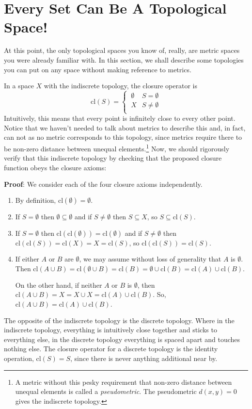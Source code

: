 \documentclass{report}
\newcommand{\cl}{\mathrm{cl}}
\begin{document}
\section{Every Set Can Be A Topological Space!}

At this point, the only topological spaces you know of, really, are metric spaces you were already familiar with. In this section, we shall describe some topologies you can put on any space without making reference to metrics.

In a space $X$ with the indiscrete topology, the closure operator is $$\cl(S) = \begin{cases} ~∅ & S = ∅\\ ~X & S \neq ∅\\ \end{cases} $$ Intuitively, this means that every point is infinitely close to every other point. Notice that we haven't needed to talk about metrics to describe this and, in fact, can not as no metric corresponds to this topology, since metrics require there to be non-zero distance between unequal elements.\footnote{A metric without this pesky requirement that non-zero distance between unequal elements is called a \emph{pseudometric}. The pseudometric $d(x,y) = 0$ gives the indiscrete topology.} Now, we should rigorously verify that this indiscrete topology by checking that the proposed closure function obeys the closure axioms:

{\bf Proof}: We consider each of the four closure axioms independently.
\begin{enumerate}
\item By definition, $\cl(∅) = ∅$.
\item If $S=∅$ then $∅ ⊆ ∅$ and if $S \neq ∅$ then $S ⊆ X$, so $S ⊆ \cl(S)$.
\item If $S=∅$ then $\cl(\cl(∅)) =  \cl(∅)$ and if $S \neq ∅$ then $\cl(\cl(S)) =  \cl(X) = X = \cl(S)$, so $\cl(\cl(S)) = \cl(S)$.
\item If either $A$ or $B$ are $∅$, we may assume without loss of generality that $A$ is $∅$. Then $\cl(A∪B) = \cl(∅∪B) = \cl(B) = ∅ ∪ \cl(B) = \cl(A) ∪ \cl(B)$. 

On the other hand, if neither $A$ or $B$ is $∅$, then $\cl(A∪B) = X = X∪X = \cl(A) ∪ \cl(B)$. So, $\cl(A∪B) =  \cl(A) ∪ \cl(B)$.
\end{enumerate}

The opposite of the indiscrete topology is the discrete topology. Where in the indiscrete topology, everything is intuitively close together and sticks to everything else, in the discrete topology everything is spaced apart and touches nothing else. The closure operator for a discrete topology is the identity operation, $\cl(S) = S$, since there is never anything additional near by.
\end{document}
